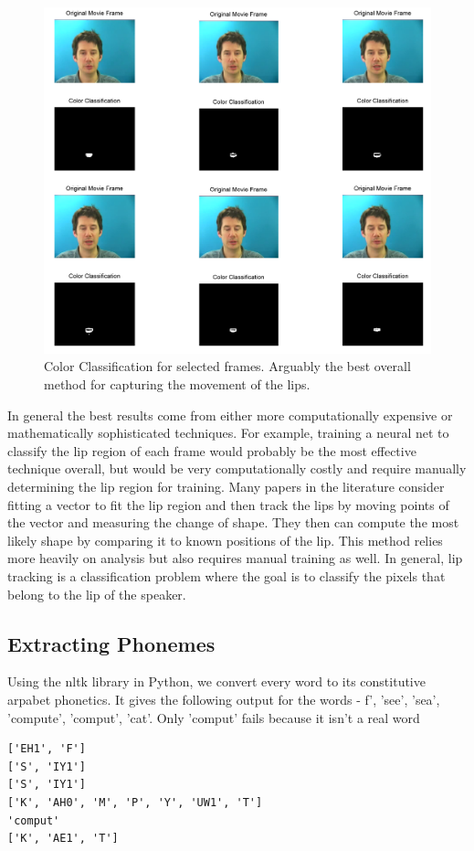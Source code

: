 \documentclass[a4paper]{article}
\begin{document}
\begin{figure}[!ht]
	\includegraphics[width=1\textwidth, height=0.75\textwidth]{color1.png}
 \caption{Color Classification for selected frames. Arguably the best overall method for capturing the movement of the lips.}
\end{figure}


In general the best results come from either more computationally expensive or mathematically sophisticated techniques. For example, training a neural net to classify the lip region of each frame would probably be the most effective technique overall, but would be very computationally costly and require manually determining the lip region for training. Many papers in the literature consider fitting a vector to fit the lip region and then track the lips by moving points of the vector and measuring the change of shape. They then can compute the most likely shape by comparing it to known positions of the lip. This method relies more heavily on analysis but also requires manual training as well. In general, lip tracking is a classification problem where the goal is to classify the pixels that belong to the lip of the speaker. 

\subsection{Extracting Phonemes}

Using the nltk library in Python, we convert every word to its constitutive arpabet phonetics. It gives the following output for the words - f', 'see', 'sea', 'compute', 'comput', 'cat'. Only 'comput' fails because it isn't a real word
\begin{verbatim}
['EH1', 'F']
['S', 'IY1']
['S', 'IY1']
['K', 'AH0', 'M', 'P', 'Y', 'UW1', 'T']
'comput'
['K', 'AE1', 'T']
\end{verbatim}
\end{document}
